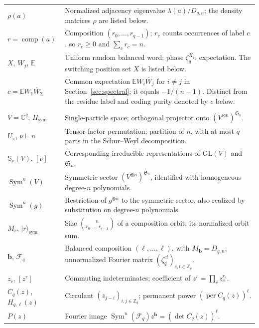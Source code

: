 \documentclass[11pt,a4paper]{article}
\numberwithin{equation}{section}
\numberwithin{figure}{section}
\numberwithin{table}{section}
\numberwithin{footnote}{section}
\theoremstyle{informal}\newtheorem*{informaltheorem}{Informal theorem}
\theoremstyle{definition}\newtheorem{example}{Example}[section]
\theoremstyle{remark}\newtheorem{remark}[theorem]{Remark}
\newcommand{\Z}{\mathbb Z}
\newcommand{\C}{\mathbb C}
\newcommand{\E}{\mathbb E}
\newcommand{\per}{\operatorname{per}}
\begin{document}
\begin{longtable}{@{}>{\raggedright\arraybackslash}p{.255\linewidth}>{\raggedright\arraybackslash}p{.70\linewidth}@{}}
\(\rho(a)\) & Normalized adjacency eigenvalue \(\lambda(a)/D_{q,n}\); the density matrices \(\rho\) are listed below.\\
\(r=\operatorname{comp}(a)\) & Composition \((r_0,\ldots,r_{q-1})\); \(r_c\) counts occurrences of label \(c\), so \(r_c\geq0\) and \(\sum_c r_c=n\).\\
\(X\), \(W_j\), \(\E\) & Uniform random balanced word; phase \(\zeta_q^{X_j}\); expectation. The switching position set \(X\) is listed below.\\
\(c=\E W_1\overline W_2\) & Common expectation \(\E W_i\overline W_j\) for \(i\ne j\) in Section~\ref{sec:spectral}; it equals \(-1/(n-1)\). Distinct from the residue label and coding purity denoted by \(c\) below.\\[3pt]
\multicolumn{2}{@{}l}{\textbf{Symmetric Schur--Weyl sector (Section~\ref{sec:fourier-counts})}}\\*
\(V=\C^q\), \(\Pi_{\mathrm{sym}}\) & Single-particle space; orthogonal projector onto \((V^{\otimes n})^{\mathfrak S_n}\).\\
\(U_\pi\), \(\nu\vdash n\) & Tensor-factor permutation; partition of \(n\), with at most \(q\) parts in the Schur--Weyl decomposition.\\
\(\mathbb S_\nu(V)\), \([\nu]\) & Corresponding irreducible representations of \(\mathrm{GL}(V)\) and \(\mathfrak S_n\).\\
\(\operatorname{Sym}^n(V)\) & Symmetric sector \((V^{\otimes n})^{\mathfrak S_n}\), identified with homogeneous degree-\(n\) polynomials.\\
\(\operatorname{Sym}^n(g)\) & Restriction of \(g^{\otimes n}\) to the symmetric sector, also realized by substitution on degree-\(n\) polynomials.\\
\(M_r\), \(|r\rangle_{\mathrm{sym}}\) & Size \(\binom n{r_0,\ldots,r_{q-1}}\) of a composition orbit; its normalized orbit sum.\\
\(\mathbf b\), \(\mathcal F_q\) & Balanced composition \((\ell,\ldots,\ell)\), with \(M_{\mathbf b}=D_{q,n}\); unnormalized Fourier matrix \((\zeta_q^{ct})_{c,t\in\Z_q}\).\\
\(z_c\), \([z^r]\) & Commuting indeterminates; coefficient of \(z^r=\prod_c z_c^{r_c}\).\\
\(C_q(z)\), \(H_{q,\ell}(z)\) & Circulant \((z_{j-i})_{i,j\in\Z_q}\); permanent power \((\per C_q(z))^\ell\).\\
\(P(z)\) & Fourier image \(\operatorname{Sym}^n(\mathcal F_q)z^{\mathbf b}=(\det C_q(z))^\ell\).\\

\end{longtable}
\end{document}
